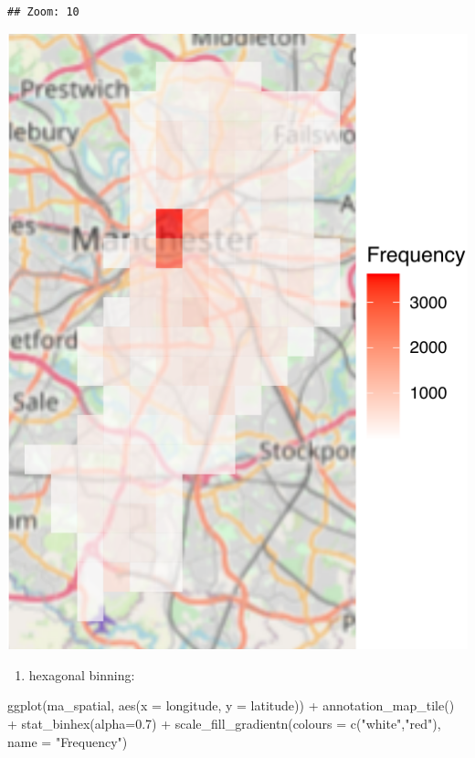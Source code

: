 \documentclass[
]{book}
\newenvironment{Shaded}{\begin{snugshade}}{\end{snugshade}}
\newcommand{\AttributeTok}[1]{\textcolor[rgb]{0.77,0.63,0.00}{#1}}
\newcommand{\FloatTok}[1]{\textcolor[rgb]{0.00,0.00,0.81}{#1}}
\newcommand{\FunctionTok}[1]{\textcolor[rgb]{0.00,0.00,0.00}{#1}}
\newcommand{\NormalTok}[1]{#1}
\newcommand{\SpecialCharTok}[1]{\textcolor[rgb]{0.00,0.00,0.00}{#1}}
\newcommand{\StringTok}[1]{\textcolor[rgb]{0.31,0.60,0.02}{#1}}
\providecommand{\tightlist}{%
  \setlength{\itemsep}{0pt}\setlength{\parskip}{0pt}}
\begin{document}
\begin{verbatim}
## Zoom: 10
\end{verbatim}

\includegraphics{crime_mapping_files/figure-latex/unnamed-chunk-128-1.pdf}

\begin{enumerate}
\def\labelenumi{\alph{enumi})}
\setcounter{enumi}{1}
\tightlist
\item
  hexagonal binning:
\end{enumerate}

\begin{Shaded}
\begin{Highlighting}[]
\FunctionTok{ggplot}\NormalTok{(ma\_spatial, }\FunctionTok{aes}\NormalTok{(}\AttributeTok{x =}\NormalTok{ longitude, }\AttributeTok{y =}\NormalTok{ latitude)) }\SpecialCharTok{+} 
  \FunctionTok{annotation\_map\_tile}\NormalTok{() }\SpecialCharTok{+} 
  \FunctionTok{stat\_binhex}\NormalTok{(}\AttributeTok{alpha=}\FloatTok{0.7}\NormalTok{) }\SpecialCharTok{+} 
  \FunctionTok{scale\_fill\_gradientn}\NormalTok{(}\AttributeTok{colours =} \FunctionTok{c}\NormalTok{(}\StringTok{"white"}\NormalTok{,}\StringTok{"red"}\NormalTok{), }
                       \AttributeTok{name =} \StringTok{"Frequency"}\NormalTok{)}
\end{Highlighting}
\end{Shaded}
\end{document}
